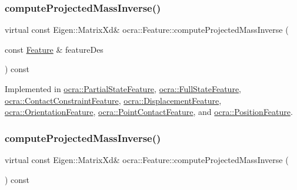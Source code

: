 \hypertarget{classocra_1_1Feature_ac529096b3fe8eba1ab88a56d8b042d37}{}\label{classocra_1_1Feature_ac529096b3fe8eba1ab88a56d8b042d37} 
\subsubsection{\texorpdfstring{compute\+Projected\+Mass\+Inverse()}{computeProjectedMassInverse()}\hspace{0.1cm}{\footnotesize\ttfamily [1/2]}}
{\footnotesize\ttfamily virtual const Eigen\+::\+Matrix\+Xd\& ocra\+::\+Feature\+::compute\+Projected\+Mass\+Inverse (\begin{DoxyParamCaption}\item[{const \hyperlink{classocra_1_1Feature}{Feature} \&}]{feature\+Des }\end{DoxyParamCaption}) const\hspace{0.3cm}{\ttfamily [pure virtual]}}



Implemented in \hyperlink{classocra_1_1PartialStateFeature_acebec8dd4cadc55641a9286fb3685674}{ocra\+::\+Partial\+State\+Feature}, \hyperlink{classocra_1_1FullStateFeature_a53b841962a372665dbd0ec7a94c4cd74}{ocra\+::\+Full\+State\+Feature}, \hyperlink{classocra_1_1ContactConstraintFeature_a9bdfabb746abff207ff9cc3e9c968c81}{ocra\+::\+Contact\+Constraint\+Feature}, \hyperlink{classocra_1_1DisplacementFeature_a4b2e46d41b46c9af72f21f6dcdeec5f5}{ocra\+::\+Displacement\+Feature}, \hyperlink{classocra_1_1OrientationFeature_ae5b32433e22fcea36c62b13811f8b5a0}{ocra\+::\+Orientation\+Feature}, \hyperlink{classocra_1_1PointContactFeature_a5425d1c3dfd4148e7adf6213e80291ba}{ocra\+::\+Point\+Contact\+Feature}, and \hyperlink{classocra_1_1PositionFeature_a30163c57355643a81bd119cd23a46cc1}{ocra\+::\+Position\+Feature}.

\hypertarget{classocra_1_1Feature_ac27bcbdbb8541e3b4e2c77a6d6f2ffc0}{}\label{classocra_1_1Feature_ac27bcbdbb8541e3b4e2c77a6d6f2ffc0} 
\subsubsection{\texorpdfstring{compute\+Projected\+Mass\+Inverse()}{computeProjectedMassInverse()}\hspace{0.1cm}{\footnotesize\ttfamily [2/2]}}
{\footnotesize\ttfamily virtual const Eigen\+::\+Matrix\+Xd\& ocra\+::\+Feature\+::compute\+Projected\+Mass\+Inverse (\begin{DoxyParamCaption}{ }\end{DoxyParamCaption}) const\hspace{0.3cm}{\ttfamily [pure virtual]}}



